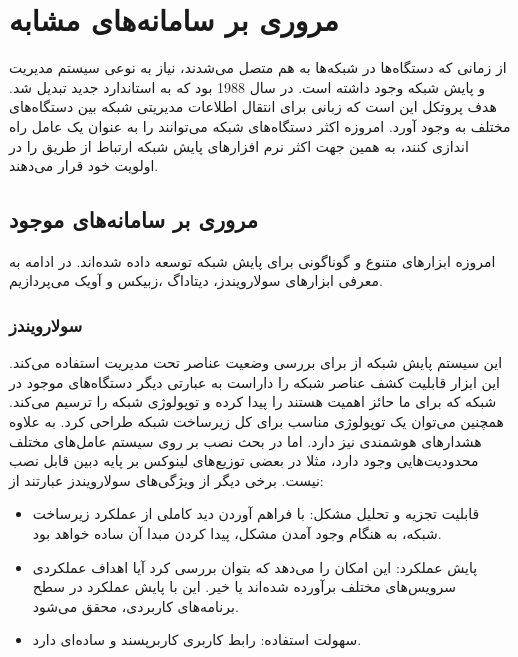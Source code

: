 \chapter{مروری بر سامانه‌های مشابه}

از زمانی که دستگاه‌ها در شبکه‌ها به هم متصل می‌شدند، نیاز به نوعی سیستم مدیریت و پایش شبکه وجود داشته است. در سال 1988 بود که  به استاندارد جدید تبدیل شد. هدف پروتکل  این است که زبانی برای انتقال اطلاعات مدیریتی شبکه بین دستگاه‌های مختلف به وجود آورد. امروزه اکثر دستگاه‌های شبکه می‌توانند  را به عنوان یک عامل راه اندازی کنند، به همین جهت اکثر نرم افزارهای پایش شبکه ارتباط از طریق  را در اولویت خود قرار می‌دهند.

\section{مروری بر سامانه‌های موجود}

امروزه ابزارهای متنوع و گوناگونی برای پایش شبکه توسعه داده شده‌اند. در ادامه به معرفی ابزارهای سولارویندز، دیتاداگ ،زبیکس و آویک می‌پردازیم.



\subsection{سولارویندز}

این سیستم پایش شبکه از  برای بررسی وضعیت عناصر تحت مدیریت استفاده می‌کند. این ابزار قابلیت کشف عناصر شبکه را داراست به عبارتی دیگر دستگاه‌های موجود در شبکه که برای ما حائز اهمیت هستند را پیدا کرده و توپولوژی شبکه را ترسیم می‌کند. همچنین می‌توان یک توپولوژی مناسب برای کل زیرساخت شبکه طراحی کرد. به علاوه هشدارهای هوشمندی نیز دارد. اما در بحث نصب بر روی سیستم‌ عامل‌های مختلف محدودیت‌هایی وجود دارد، مثلا در بعضی توزیع‌های لینوکس بر پایه دبین قابل نصب نیست. برخی دیگر از ویژگی‌های سولارویندز عبارتند از:

\begin{itemize}
    \item قابلیت تجزیه و تحلیل مشکل: با فراهم آوردن دید کاملی از عملکرد زیرساخت شبکه، به هنگام وجود آمدن مشکل، پیدا کردن مبدا آن ساده خواهد بود.
    \item پایش عملکرد: این امکان را می‌دهد که بتوان بررسی کرد آیا اهداف عملکردی سرویس‌های مختلف برآورده شده‌اند یا خیر. این با پایش عملکرد در سطح برنامه‌های کاربردی، محقق می‌شود.
    \item سهولت استفاده: رابط کاربری کاربرپسند و ساده‌ای دارد.
\end{itemize}

